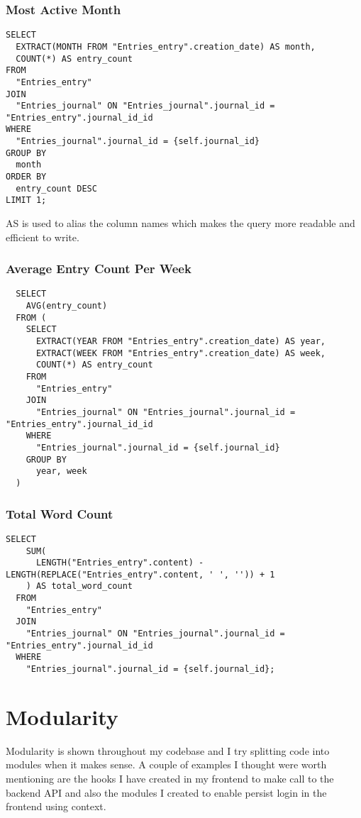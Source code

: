 \subsubsection{Most Active Month}
\begin{verbatim}
SELECT
  EXTRACT(MONTH FROM "Entries_entry".creation_date) AS month,
  COUNT(*) AS entry_count
FROM
  "Entries_entry"
JOIN
  "Entries_journal" ON "Entries_journal".journal_id = "Entries_entry".journal_id_id
WHERE
  "Entries_journal".journal_id = {self.journal_id}
GROUP BY
  month
ORDER BY
  entry_count DESC
LIMIT 1;
\end{verbatim}

AS is used to alias the column names which makes the query more readable and efficient to write.

\subsubsection{Average Entry Count Per Week}
\begin{verbatim}
  SELECT
    AVG(entry_count)
  FROM (
    SELECT
      EXTRACT(YEAR FROM "Entries_entry".creation_date) AS year,
      EXTRACT(WEEK FROM "Entries_entry".creation_date) AS week,
      COUNT(*) AS entry_count
    FROM
      "Entries_entry"
    JOIN
      "Entries_journal" ON "Entries_journal".journal_id = "Entries_entry".journal_id_id
    WHERE
      "Entries_journal".journal_id = {self.journal_id}
    GROUP BY
      year, week
  )
\end{verbatim}

\subsubsection{Total Word Count}
\begin{verbatim}
SELECT
    SUM(
      LENGTH("Entries_entry".content) - LENGTH(REPLACE("Entries_entry".content, ' ', '')) + 1
    ) AS total_word_count
  FROM
    "Entries_entry"
  JOIN
    "Entries_journal" ON "Entries_journal".journal_id = "Entries_entry".journal_id_id
  WHERE
    "Entries_journal".journal_id = {self.journal_id};
\end{verbatim}

\section{Modularity}
Modularity is shown throughout my codebase and I try splitting code into modules when it makes sense. A couple of examples I thought were worth mentioning are the hooks I have created in my frontend to make call to the backend API and also the modules I created to enable persist login in the frontend using context. 

